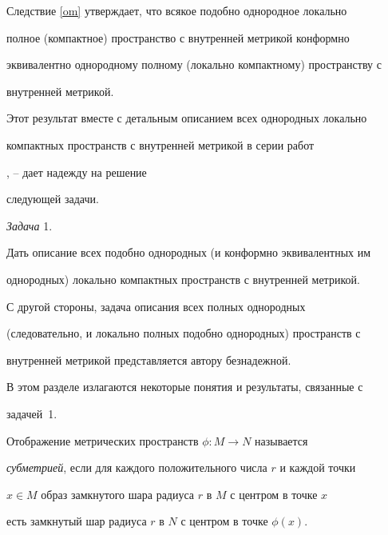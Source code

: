 Следствие \ref{om} утверждает, что всякое подобно однородное локально


полное (компактное) пространство с внутренней метрикой конформно


эквивалентно однородному полному (локально компактному) пространству с


внутренней метрикой.





Этот результат вместе с детальным описанием всех однородных локально


компактных пространств с внутренней метрикой в серии работ 


\cite{D}, \cite{B}--\cite{B3} дает надежду на решение


следующей задачи.


\medskip





{\it Задача} 1. \label{qu1}


Дать описание всех подобно однородных (и конформно эквивалентных им


однородных) локально компактных пространств с внутренней метрикой.


\medskip





С другой стороны, задача описания всех полных однородных


(следовательно, и локально полных подобно однородных) пространств с


внутренней метрикой представляется автору безнадежной.





В этом разделе излагаются некоторые понятия и результаты, связанные с


задачей~1.





\begin{defns}


Отображение метрических пространств $\phi: M \rightarrow N$ называется


{\it субметрией}, если для каждого положительного числа $r$ и каждой точки


$x \in M$ образ замкнутого шара радиуса $r$ в $M$ с центром в точке $x$


есть замкнутый шар радиуса $r$ в $N$ с центром в точке $\phi(x)$.


\end{defns}





